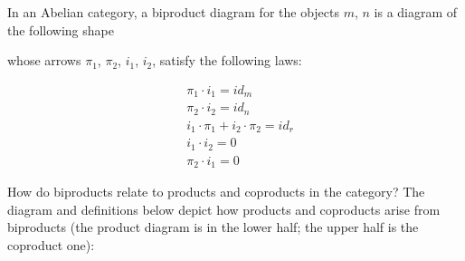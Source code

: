 \documentclass[
  oneside,
  11pt, a4paper,
  footinclude=true,
  headinclude=true,
  cleardoublepage=empty
]{scrbook}
\theoremstyle{definition}
\theoremstyle{definition}
\begin{document}
        In an Abelian category, a biproduct diagram for the objects $m$, $n$ is a diagram of the following shape
        
        \begin{center}
        \end{center}{}
        
        \noindent whose arrows $\pi_1$, $\pi_2$, $i_1$, $i_2$, satisfy the following laws:
        
        \begin{align*}
           &\pi_1 \cdot i_1 = id_m \\
           &\pi_2 \cdot i_2 = id_n \\
           &i_1 \cdot \pi_1 + i_2 \cdot \pi_2 = id_r \\
           &i_1 \cdot i_2 = 0 \\
           &\pi_2 \cdot i_1 = 0
        \end{align*}
        
        How do biproducts relate to products and coproducts in the category? The diagram and definitions below depict how products and coproducts arise from biproducts (the product diagram is in the lower half; the upper half is the coproduct one): 
        
        \begin{center}
        \end{center}{}
        
\end{document}
